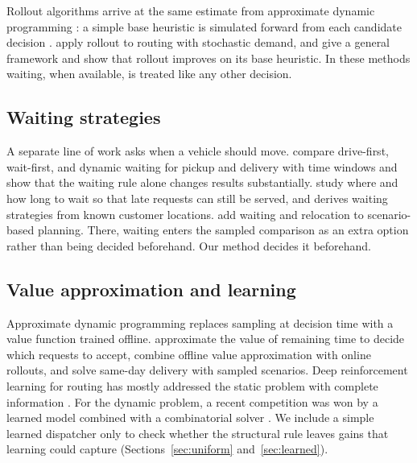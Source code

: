 \documentclass[5p,times,authoryear]{elsarticle}
\begin{document}
Rollout algorithms arrive at the same estimate from approximate dynamic programming \citep{powell2011adp}: a simple base heuristic is simulated forward from each candidate decision \citep{bertsekas1997rollout}. \citet{secomandi2001rollout} apply rollout to routing with stochastic demand, and \citet{goodson2013rollout,goodson2017rollout} give a general framework and show that rollout improves on its base heuristic. In these methods waiting, when available, is treated like any other decision.

\subsection{Waiting strategies}

A separate line of work asks when a vehicle should move. \citet{mitrovic2004waiting} compare drive-first, wait-first, and dynamic waiting for pickup and delivery with time windows and show that the waiting rule alone changes results substantially. \citet{branke2005waiting} study where and how long to wait so that late requests can still be served, and \citet{thomas2007waiting} derives waiting strategies from known customer locations. \citet{bent2007waiting} add waiting and relocation to scenario-based planning. There, waiting enters the sampled comparison as an extra option rather than being decided beforehand. Our method decides it beforehand.

\subsection{Value approximation and learning}

Approximate dynamic programming replaces sampling at decision time with a value function trained offline. \citet{ulmer2018budgeting} approximate the value of remaining time to decide which requests to accept, \citet{ulmer2019adp} combine offline value approximation with online rollouts, and \citet{voccia2019sameday} solve same-day delivery with sampled scenarios. Deep reinforcement learning for routing has mostly addressed the static problem with complete information \citep{nazari2018rl,kool2019attention}. For the dynamic problem, a recent competition was won by a learned model combined with a combinatorial solver \citep{baty2024combinatorial}. We include a simple learned dispatcher only to check whether the structural rule leaves gains that learning could capture (Sections~\ref{sec:uniform} and~\ref{sec:learned}).

\end{document}
